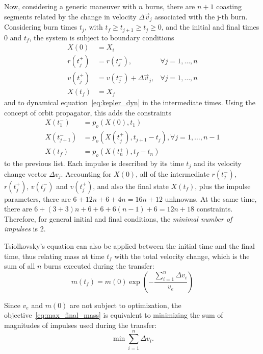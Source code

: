 Now, considering a generic maneuver with \(n\) burns, there are \(n+1\) coasting segments related by the change in velocity \(\Delta \vec v_j\) associated with the j-th burn. Considering burn times \(t_j\), with \(t_f \geq t_{j+1} \geq t_j \geq 0\), and the initial and final times \(0\) and \(t_f\), the system is subject to boundary conditions
\begin{align}
    X(0) &= X_i \\
    r(t_j^+) &= r(t_j^-),& \forall j=1,\dots,n \\
    v(t_j^+) &= v(t_j^-) + \Delta \vec v_j,& \forall j=1,\dots,n \\
    X(t_f) &= X_f
\end{align}
and to dynamical equation~\eqref{eq:kepler_dyn} in the intermediate times. Using the concept of orbit propagator, this adds the constraints
\begin{align}
    X(t_1^-) &= p_o(X(0), t_1) \\
    X(t_{j+1}^-) &= p_o(X(t_j^+), t_{j+1} - t_j), \forall j = 1, \dots, n-1 \\
    X(t_f) &= p_o(X(t_n^+), t_f - t_n)
\end{align}
to the previous list. Each impulse is described by its time \(t_j\) and its velocity change vector \(\Delta v_j\). Accounting for \(X(0)\), all of the intermediate \(r(t_j^-)\), \(r(t_j^+)\), \(v(t_j^-)\) and \(v(t_j^+)\), and also the final state \(X(t_f)\), plus the impulse parameters, there are \(6 + 12n + 6 + 4n = 16n + 12\) unknowns. At the same time, there are \(6 + (3 + 3)n + 6 + 6 + 6(n-1) + 6 = 12n + 18\) constraints. Therefore, for general initial and final conditions, the \textit{minimal number of impulses} is 2. 


Tsiolkovsky's equation can also be applied between the initial time and the final time, thus relating mass at time \(t_f\) with the total velocity change, which is the sum of all \(n\) burns executed during the transfer:
\begin{equation}
    m(t_f) = m(0) \exp{\left(-\frac{\sum_{i=1}^{n}\Delta v_i}{v_e}\right)}
\end{equation}

Since \(v_e\) and \(m(0)\) are not subject to optimization, the objective~\eqref{eq:max_final_mass} is equivalent to minimizing the sum of magnitudes of impulses used during the transfer:
\begin{equation}
    \min \sum_{i=1}^{n} \Delta v_i.
\end{equation}


